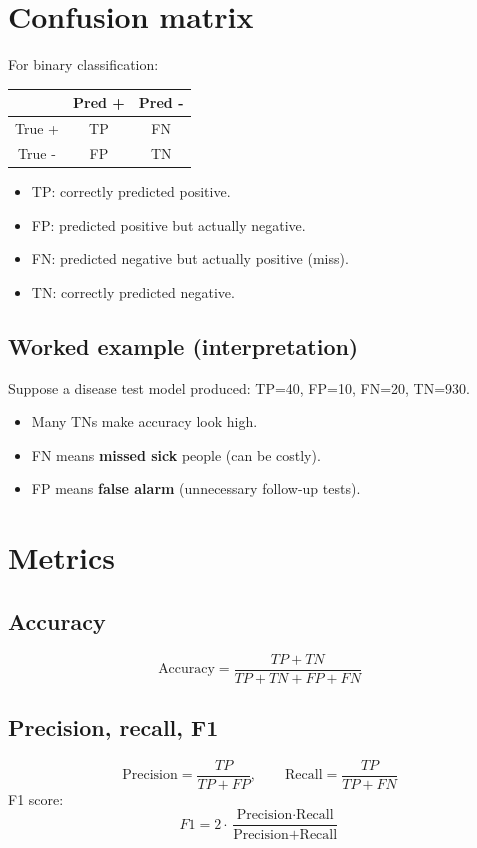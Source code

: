 \documentclass[11pt]{article}
\begin{document}
\section{Confusion matrix}
For binary classification:
\begin{center}
\begin{tabular}{c|cc}
  & Pred + & Pred - \\\hline
  True + & TP & FN \\
  True - & FP & TN \\
\end{tabular}
\end{center}
\begin{itemize}[leftmargin=*]
  \item TP: correctly predicted positive.
  \item FP: predicted positive but actually negative.
  \item FN: predicted negative but actually positive (miss).
  \item TN: correctly predicted negative.
\end{itemize}

\subsection{Worked example (interpretation)}
Suppose a disease test model produced: TP=40, FP=10, FN=20, TN=930.
\begin{itemize}[leftmargin=*]
  \item Many TNs make accuracy look high.
  \item FN means \textbf{missed sick} people (can be costly).
  \item FP means \textbf{false alarm} (unnecessary follow-up tests).
\end{itemize}

\section{Metrics}
\subsection{Accuracy}
\[
  \text{Accuracy} = \frac{TP + TN}{TP+TN+FP+FN}
\]

\subsection{Precision, recall, F1}
\[
  \text{Precision} = \frac{TP}{TP+FP},\qquad
  \text{Recall} = \frac{TP}{TP+FN}
\]
F1 score:
\[
  F1 = 2\cdot \frac{\text{Precision}\cdot\text{Recall}}{\text{Precision}+\text{Recall}}
\]
\end{document}
